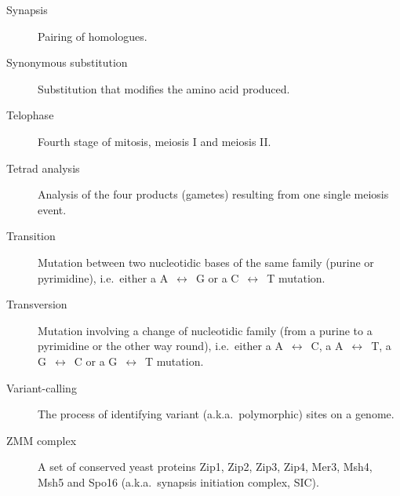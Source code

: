 \begin{alwayssingle}
\begin{description}
		\item[Synapsis] Pairing of homologues.
		\item[Synonymous substitution] Substitution that modifies the amino acid produced.
		\item[Telophase] Fourth stage of mitosis, meiosis I and meiosis II\@.
		\item[Tetrad analysis] Analysis of the four products (gametes) resulting from one single meiosis event.
		\item[Transition] Mutation between two nucleotidic bases of the same family (purine or pyrimidine), i.e.\ either a A~$\leftrightarrow$~G or a C~$\leftrightarrow$~T mutation.
		\item[Transversion] Mutation involving a change of nucleotidic family (from a purine to a pyrimidine or the other way round), i.e.\ either a A~$\leftrightarrow$~C, a A~$\leftrightarrow$~T, a G~$\leftrightarrow$~C or a G~$\leftrightarrow$~T mutation.
		\item[Variant-calling] The process of identifying variant (a.k.a.\ polymorphic) sites on a genome.
		\item[ZMM complex] A set of conserved yeast proteins Zip1, Zip2, Zip3, Zip4, Mer3, Msh4, Msh5 and Spo16 (a.k.a.\ synapsis initiation complex, SIC).








	\end{description}
\end{alwayssingle}
\mtcaddchapter{}


